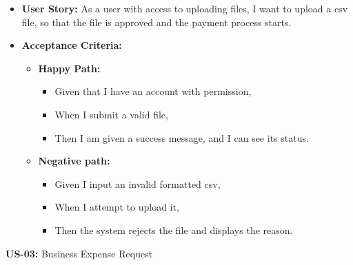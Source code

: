 \documentclass[11pt,a4paper]{article}
\begin{document}
\begin{itemize}
\item
  \textbf{User Story:} As a user with access to uploading files, I want
  to upload a csv file, so that the file is approved and the payment
  process starts.
\item
  \textbf{Acceptance Criteria:}

  \begin{itemize}
  \item
    \textbf{Happy Path:}

    \begin{itemize}
    \item
      Given that I have an account with permission,
    \item
      When I submit a valid file,
    \item
      Then I am given a success message, and I can see its status.
    \end{itemize}
  \item
    \textbf{Negative path:}

    \begin{itemize}
    \item
      Given I input an invalid formatted csv,
    \item
      When I attempt to upload it,
    \item
      Then the system rejects the file and displays the reason.
    \end{itemize}
  \end{itemize}
\end{itemize}
\newpage
\textbf{US-03:} Business Expense Request
\end{document}
